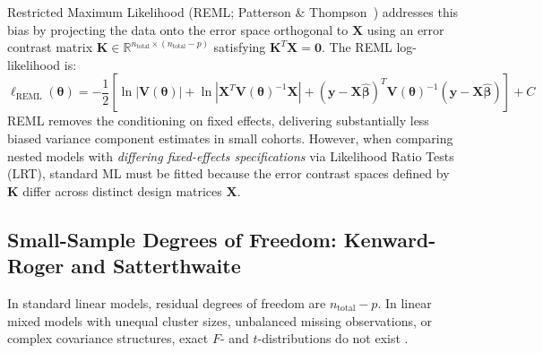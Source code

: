 \documentclass[11pt,twoside,openright]{book}
\begin{document}
Restricted Maximum Likelihood (REML; Patterson \& Thompson~\cite{patterson1971recovery}) addresses this bias by projecting the data onto the error space orthogonal to $\mathbf{X}$ using an error contrast matrix $\mathbf{K} \in \mathbb{R}^{n_{\text{total}} \times (n_{\text{total}}-p)}$ satisfying $\mathbf{K}^T \mathbf{X} = \mathbf{0}$. The REML log-likelihood is:
\begin{equation}
\label{eq:reml_likelihood}
\ell_{\text{REML}}(\boldsymbol{\theta}) = -\frac{1}{2} \left[ \ln |\mathbf{V}(\boldsymbol{\theta})| + \ln |\mathbf{X}^T \mathbf{V}(\boldsymbol{\theta})^{-1} \mathbf{X}| + (\mathbf{y} - \mathbf{X}\hat{\boldsymbol{\beta}})^T \mathbf{V}(\boldsymbol{\theta})^{-1} (\mathbf{y} - \mathbf{X}\hat{\boldsymbol{\beta}}) \right] + C
\end{equation}
REML removes the conditioning on fixed effects, delivering substantially less biased variance component estimates in small cohorts. However, when comparing nested models with \textit{differing fixed-effects specifications} via Likelihood Ratio Tests (LRT), standard ML must be fitted because the error contrast spaces defined by $\mathbf{K}$ differ across distinct design matrices $\mathbf{X}$.

\subsection{Small-Sample Degrees of Freedom: Kenward-Roger and Satterthwaite}

In standard linear models, residual degrees of freedom are $n_{\text{total}} - p$. In linear mixed models with unequal cluster sizes, unbalanced missing observations, or complex covariance structures, exact $F$- and $t$-distributions do not exist \cite{kuznetsova2017lmertest}. 
\end{document}
